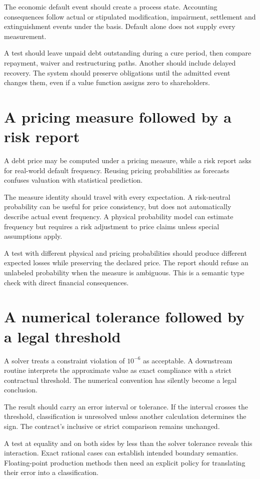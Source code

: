 The economic default event should create a process state. Accounting consequences follow actual or stipulated modification, impairment, settlement and extinguishment events under the basis. Default alone does not supply every measurement.

A test should leave unpaid debt outstanding during a cure period, then compare repayment, waiver and restructuring paths. Another should include delayed recovery. The system should preserve obligations until the admitted event changes them, even if a value function assigns zero to shareholders.

\section{A pricing measure followed by a risk report}
A debt price may be computed under a pricing measure, while a risk report asks for real-world default frequency. Reusing pricing probabilities as forecasts confuses valuation with statistical prediction.

The measure identity should travel with every expectation. A risk-neutral probability can be useful for price consistency, but does not automatically describe actual event frequency. A physical probability model can estimate frequency but requires a risk adjustment to price claims unless special assumptions apply.

A test with different physical and pricing probabilities should produce different expected losses while preserving the declared price. The report should refuse an unlabeled probability when the measure is ambiguous. This is a semantic type check with direct financial consequences.

\section{A numerical tolerance followed by a legal threshold}
A solver treats a constraint violation of $10^{-6}$ as acceptable. A downstream routine interprets the approximate value as exact compliance with a strict contractual threshold. The numerical convention has silently become a legal conclusion.

The result should carry an error interval or tolerance. If the interval crosses the threshold, classification is unresolved unless another calculation determines the sign. The contract's inclusive or strict comparison remains unchanged.

A test at equality and on both sides by less than the solver tolerance reveals this interaction. Exact rational cases can establish intended boundary semantics. Floating-point production methods then need an explicit policy for translating their error into a classification.

